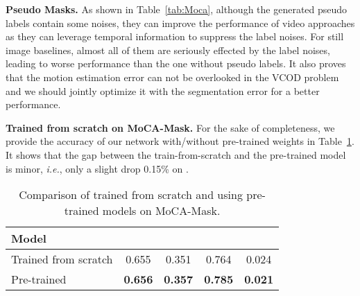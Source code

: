 \documentclass[10pt,twocolumn,letterpaper]{article}
\def\ie{\emph{i.e.}}
\def\tabref#1{Table~\ref{#1}}
\begin{document}
\textbf{Pseudo Masks.} As shown in \tabref{tab:Moca}, although the generated pseudo labels contain some noises, they can improve the performance of video approaches as they can leverage temporal information to suppress the label noises. For still image baselines, almost all of them are seriously effected by the label noises, leading to worse performance than the one without pseudo labels. It also proves that the motion estimation error can not be overlooked in the VCOD problem and we should jointly optimize it with the segmentation error for a better performance. 

\textbf{Trained from scratch on MoCA-Mask.} 
For the sake of completeness, we provide the accuracy of our network with/without pre-trained weights in Table~\ref{tab:train_from_scratch}. It shows that the gap between the train-from-scratch and the pre-trained model is minor, \ie, only a slight drop 0.15\% on .

\begin{table}[h!]
    \footnotesize
    \centering
    \caption{Comparison of trained from scratch and using pre-trained models on MoCA-Mask.  }
    \label{tab:train_from_scratch}
    \vspace{-10pt}
    \tabcolsep=0.2cm
    \renewcommand{\arraystretch}{0.5}
    \begin{tabular}{l|cccc}
    \toprule
      Model  &  &  & & \\
     \midrule
     Trained from scratch & 0.655 & 0.351 & 0.764 & 0.024 \\
     Pre-trained & \textbf{0.656} &  \textbf{0.357} & \textbf{0.785}  & \textbf{0.021} \\
    \bottomrule
    \end{tabular}
\vspace{-5pt}
\end{table}
\end{document}
